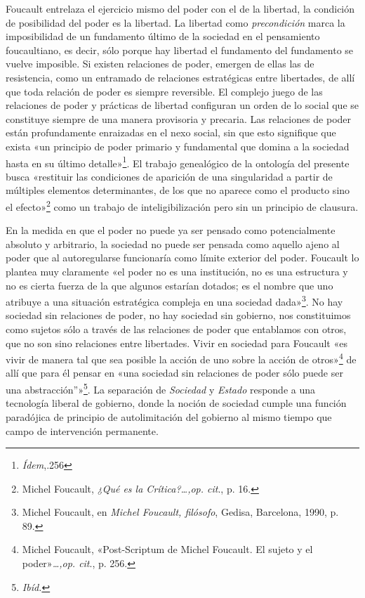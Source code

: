 Foucault entrelaza el ejercicio mismo del poder con el de la libertad, la condición de posibilidad del poder es la libertad. La libertad como \emph{precondición} marca la imposibilidad de un fundamento último de la sociedad en el pensamiento foucaultiano, es decir, sólo porque hay libertad el fundamento del fundamento se vuelve imposible. Si existen relaciones de poder, emergen de ellas las de resistencia, como un entramado de relaciones estratégicas entre libertades, de allí que toda relación de poder es siempre reversible. El complejo juego de las relaciones de poder y prácticas de libertad configuran un orden de lo social que se constituye siempre de una manera provisoria y precaria. Las relaciones de poder están profundamente enraizadas en el nexo social, sin que esto signifique que exista «un principio de poder primario y fundamental que domina a la sociedad hasta en su último detalle»\footnote{\emph{Ídem},.256}. El trabajo genealógico de la ontología del presente busca «restituir las condiciones de aparición de una singularidad a partir de múltiples elementos determinantes, de los que no aparece como el producto sino el efecto»\footnote{Michel Foucault, \emph{¿Qué es la Crítica?\ldots,op. cit}., p. 16.} como un trabajo de inteligibilización pero sin un principio de clausura.

En la medida en que el poder no puede ya ser pensado como potencialmente absoluto y arbitrario, la sociedad no puede ser pensada como aquello ajeno al poder que al autoregularse funcionaría como límite exterior del poder. Foucault lo plantea muy claramente «el poder no es una institución, no es una estructura y no es cierta fuerza de la que algunos estarían dotados; es el nombre que uno atribuye a una situación estratégica compleja en una sociedad dada»\footnote{Michel Foucault, en \emph{Michel Foucault, filósofo}, Gedisa, Barcelona, 1990, p. 89.}. No hay sociedad sin relaciones de poder, no hay sociedad sin gobierno, nos constituimos como sujetos sólo a través de las relaciones de poder que entablamos con otros, que no son sino relaciones entre libertades. Vivir en sociedad para Foucault «es vivir de manera tal que sea posible la acción de uno sobre la acción de otros»\footnote{Michel Foucault, «Post-Scriptum de Michel Foucault. El sujeto y el poder»\emph{\ldots,op. cit}., p. 256.} de allí que para él pensar en «una sociedad sin relaciones de poder sólo puede ser una abstracción''»\footnote{\emph{Ibíd.}}. La separación de \emph{Sociedad} y \emph{Estado} responde a una tecnología liberal de gobierno, donde la noción de sociedad cumple una función paradójica de principio de autolimitación del gobierno al mismo tiempo que campo de intervención permanente.

